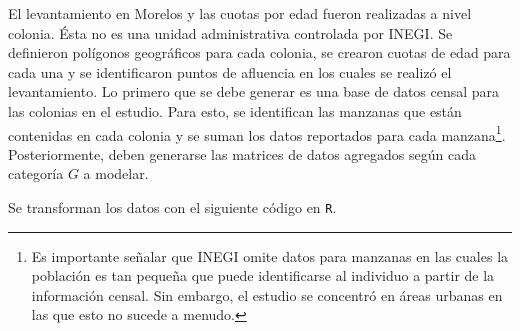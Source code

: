 \documentclass[]{article}
\let\rmarkdownfootnote\footnote%
\def\footnote{\protect\rmarkdownfootnote}
\begin{document}
El levantamiento en Morelos y las cuotas por edad fueron realizadas a
nivel colonia. Ésta no es una unidad administrativa controlada por
INEGI. Se definieron polígonos geográficos para cada colonia, se crearon
cuotas de edad para cada una y se identificaron puntos de afluencia en
los cuales se realizó el levantamiento. Lo primero que se debe generar
es una base de datos censal para las colonias en el estudio. Para esto,
se identifican las manzanas que están contenidas en cada colonia y se
suman los datos reportados para cada manzana\footnote{Es importante
  señalar que INEGI omite datos para manzanas en las cuales la población
  es tan pequeña que puede identificarse al individuo a partir de la
  información censal. Sin embargo, el estudio se concentró en áreas
  urbanas en las que esto no sucede a menudo.}. Posteriormente, deben
generarse las matrices de datos agregados según cada categoría $G$ a
modelar.

Se transforman los datos con el siguiente código en \texttt{R}.
\end{document}
